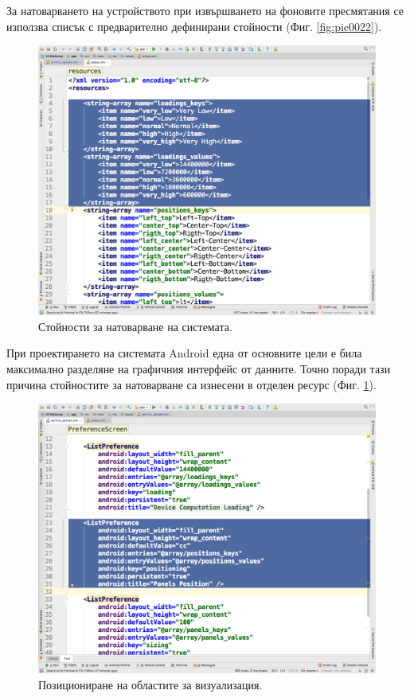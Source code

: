 \documentclass[book,14pt,oneside,openany]{memoir}
\begin{document}
За натоварването на устройството при извършването на фоновите пресмятания се използва списък с предварително дефинирани стойности (Фиг. \ref{fig:pic0022}). 

\begin{figure}[h]
  \centering
  \includegraphics[height=0.45\pdfpageheight]{pic0023}
  \caption{Стойности за натоварване на системата.}
\label{fig:pic0023}
\end{figure}
\FloatBarrier

При проектирането на системата Android една от основните цели е била максимално разделяне на графичния интерфейс от данните. Точно поради тази причина стойностите за натоварване са изнесени в отделен ресурс (Фиг. \ref{fig:pic0023}).

\begin{figure}[h]
  \centering
  \includegraphics[height=0.45\pdfpageheight]{pic0024}
  \caption{Позициониране на областите за визуализация.}
\label{fig:pic0024}
\end{figure}
\FloatBarrier
\end{document}
